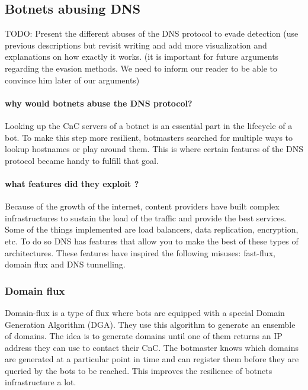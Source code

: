 \subsection{Botnets abusing DNS}
TODO: Present the different abuses of the DNS protocol to evade detection
(use previous descriptions but revisit writing and add more visualization and explanations on how exactly it works. (it is important for future arguments regarding the evasion methods. We need to inform our reader to be able to convince him later of our arguments)

\paragraph{why would botnets abuse the DNS protocol?}
Looking up the CnC servers of a botnet is an essential part in the lifecycle of a bot. To make this step more resilient, botmasters searched for multiple ways to lookup hostnames or play around them. This is where certain features of the DNS protocol became handy to fulfill that goal.
\paragraph{what features did they exploit ?}
Because of the growth of the internet, content providers have built complex infrastructures to sustain the load of the traffic and provide the best services. Some of the things implemented are load balancers, data replication, encryption, etc. To do so DNS has features that allow you to make the best of these types of architectures. These features have inspired the following misuses: fast-flux, domain flux and DNS tunnelling.

\subsubsection{Domain flux}
Domain-flux is a type of flux where bots are equipped with a special Domain Generation Algorithm (DGA). They use this algorithm to generate an ensemble of domains. The idea is to generate domains until one of them returns an IP address they can use to contact their CnC. The botmaster knows which domains are generated at a particular point in time and can register them before they are queried by the bots to be reached. This improves the resilience of botnets infrastructure a lot.

